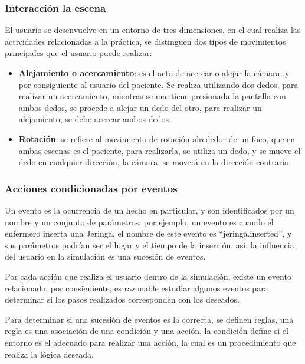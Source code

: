 \subsubsection{Interacción la escena}

El usuario se desenvuelve en un entorno de tres dimensiones, en el cual realiza las
actividades relacionadas a la práctica, se distinguen dos tipos de movimientos
principales que el usuario puede realizar:

\begin{itemize}
    \item \textbf{Alejamiento o acercamiento}: es el acto de acercar o alejar la
        cámara, y por consiguiente al usuario del paciente. Se realiza
        utilizando dos dedos, para realizar un acercamiento, mientras se
        mantiene presionada la pantalla con ambos dedos, se procede a alejar un
        dedo del otro, para realizar un alejamiento, se debe acercar ambos
        dedos.
    \item \textbf{Rotación}: se refiere al movimiento de rotación alrededor de
        un foco, que en ambas escenas es el paciente, para realizarla, se utiliza
        un dedo, y se mueve el dedo en cualquier dirección, la cámara, se moverá
        en la dirección contraria.
\end{itemize}


\subsubsection{Acciones condicionadas por eventos}


Un evento es la ocurrencia de un hecho en particular, y son identificados por un
nombre y un conjunto de parámetros, por ejemplo, un evento es cuando el
enfermero inserta una Jeringa, el nombre de este evento es
\enquote{jeringa.inserted}, y sus parámetros podrían ser el lugar y el tiempo de
la inserción, así, la influencia del usuario en la simulación es una sucesión de
eventos.

Por cada acción que realiza el usuario dentro de la simulación, existe un evento
relacionado, por consiguiente, es razonable estudiar algunos eventos para
determinar si los pasos realizados corresponden con los deseados. 

Para determinar si una sucesión de eventos es la correcta, se definen reglas,
una regla es una asociación de una condición y una acción, la condición define
si el entorno es el adecuado para realizar una acción, la cual es un
procedimiento que realiza la lógica deseada.

